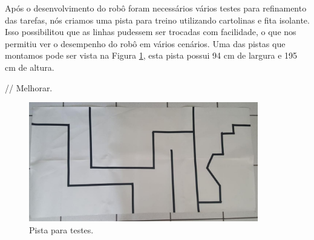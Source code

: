 Após o desenvolvimento do robô foram necessários vários testes para refinamento das tarefas, nós criamos uma pista para treino utilizando cartolinas e fita isolante. Isso possibilitou que as linhas pudessem ser trocadas com facilidade, o que nos permitiu ver o desempenho do robô em vários cenários.  Uma das pistas que montamos pode ser vista na Figura \ref{pista}, esta pista possui 94 cm de largura e 195 cm de altura.


//  Melhorar.

\begin{figure}[!htb]
	\centering
	\includegraphics[width=10cm]{images/pista.png}
	\caption{Pista para testes.}
	\label{pista}
\end{figure}

\newpage